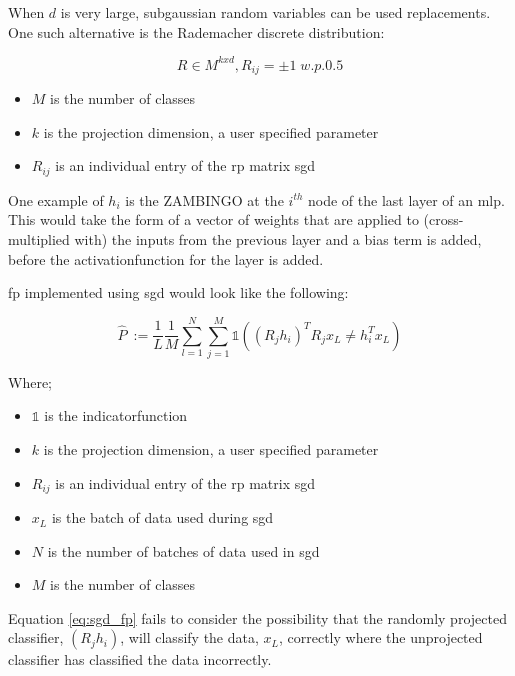 When $d$ is very large, subgaussian random variables can be used replacements. One such alternative is the Rademacher discrete distribution:

\begin{equation}
R \in M^{kxd}, R_{ij} = \pm 1 \; w.p. 0.5 
\end{equation}

\begin{itemize}
\item $M$ is the number of classes  
\item $k$ is the projection dimension, a user specified parameter 
\item $R_{ij}$ is an individual entry of the \gls{rp} matrix  \gls{sgd}  
\end{itemize}

One example of $h_i$ is the ZAMBINGO at the $i^{th}$ node of the last layer of an \gls{mlp}. This would take the form of a vector of weights that are applied to (cross-multiplied with) the inputs from the previous layer and a bias term is added, before the \gls{activationfunction} for the layer is added.
\bigskip

\bigskip

\gls{fp} implemented using  \gls{sgd} would look like the following:

\begin{equation}
\label{eq:sgd_fp}
\hat{P}\ := \frac{1}{L}\frac{1}{M}\sum_{l = 1}^N \sum_{j = 1}^M \mathds{1}((R_j h_i)^T R_jx_L \neq h_i^Tx_L)  
\end{equation}

Where;  \smallskip

\begin{itemize}
\item $\mathds{1}$ is the \gls{indicatorfunction}  
\item $k$ is the projection dimension, a user specified parameter 
\item $R_{ij}$ is an individual entry of the \gls{rp} matrix  \gls{sgd} 
\item $x_L$ is the batch of data used during  \gls{sgd}  
\item $N$ is the number of batches of data used in  \gls{sgd}  
\item $M$ is the number of classes %
\end{itemize}

Equation \ref{eq:sgd_fp} fails to consider the possibility that the randomly projected classifier,  $(R_j h_i)$, will classify the data, $x_L$, correctly where the unprojected classifier has classified the data incorrectly.
\bigskip

